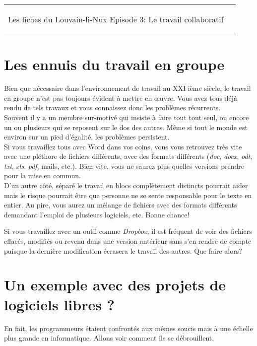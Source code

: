 



\begin{tabular}{p{13cm}r}
	\begin{center}{\Large Les fiches du Louvain-li-Nux\linebreak \linebreak
	\LARGE Episode 3: Le travail collaboratif}\end{center}
		&
	\usebox{\logollnux}
\end{tabular}


\section*{Les ennuis du travail en groupe}
Bien que nécessaire dans l'environnement de travail au XXI ième siècle, le travail
en groupe n'est pas toujours évident à mettre en \oe uvre. 
Vous avez tous déjà rendu de tels travaux et vous connaissez donc les problèmes récurrents.\\

Souvent il y a un membre sur-motivé qui insiste à faire tout tout seul, ou encore
un ou plusieurs qui se reposent sur le dos des autres. Même si tout le monde est environ
sur un pied d'égalité, les problèmes persistent. \\

Si vous travaillez tous avec Word dans vos coins, vous vous retrouvez très vite avec une pléthore de fichiers différents, avec des formats différents (\textit{doc}, \textit{docx}, \textit{odt}, \textit{txt}, \textit{xls}, \textit{pdf}, mails, etc.).
Bien vite, vous ne saurez plus quelles versions prendre pour la mise en commun.\\
D'un autre côté, séparé le travail en blocs complètement distincts pourrait aider mais le risque pourrait être que personne ne se sente responsable pour le texte en entier.
Au pire, vous aurez un mélange de fichiers avec des formats différents demandant l'emploi de plusieurs logiciels, etc. Bonne chance!

Si vous travaillez avec un outil comme \textit{Dropbox}, il est fréquent de voir des fichiers effacés, modifiés ou revenu dans une version antérieur sans s'en rendre de compte puisque la dernière modification écrasera le travail des autres. Que faire alors?

\section*{Un exemple avec des projets de logiciels libres ?}
En fait, les programmeurs étaient confrontés aux mêmes soucis mais 
à une échelle plus grande  en informatique. Allons voir comment ils se débrouillent.

